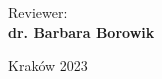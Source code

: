 \begin{titlepage}
\begin{minipage}{0.4\textwidth}
  Reviewer: \\
  \textbf{dr. Barbara Borowik}
  \end{minipage}

  \vfill
  \vfill
  
  \begin{center}
    Kraków 2023
  \end{center}

\end{titlepage}
